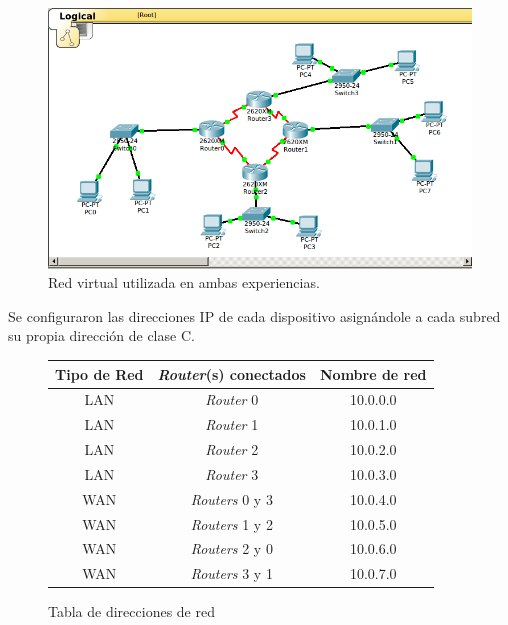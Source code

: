 \documentclass[spanish]{udpreport}
\begin{document}
\begin{figure}[H]
	\begin{center}
		\includegraphics[width= 17cm]{Imagenes/red_pela}
		\caption{Red virtual utilizada en ambas experiencias.}
	\end{center}
\end{figure}

Se configuraron las direcciones IP de cada dispositivo asignándole a cada subred su propia dirección de clase C.

\begin{figure}[H]
	\begin{center}
    	\begin{tabular}{ c | c | c }
        	\textbf{Tipo de Red} & \textbf{\textit{Router}(s) conectados} & \textbf{Nombre de red}\\
            \hline
            LAN & \textit{Router} 0 & 10.0.0.0 \\
            LAN & \textit{Router} 1 & 10.0.1.0 \\
            LAN & \textit{Router} 2 & 10.0.2.0 \\
            LAN & \textit{Router} 3 & 10.0.3.0 \\
            WAN & \textit{Routers} 0 y 3 & 10.0.4.0 \\
            WAN & \textit{Routers} 1 y 2 & 10.0.5.0 \\
            WAN & \textit{Routers} 2 y 0 & 10.0.6.0 \\
            WAN & \textit{Routers }3 y 1 & 10.0.7.0 \\
        \end{tabular}
        \caption{Tabla de direcciones de red}
	\end{center}
\end{figure}
\end{document}
